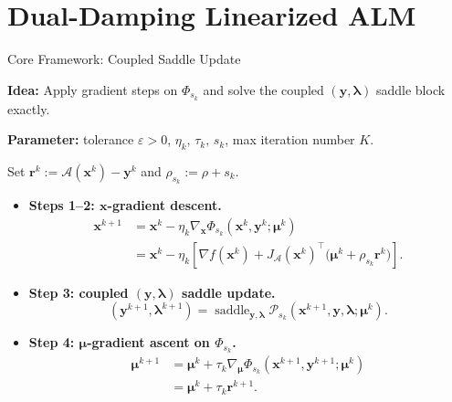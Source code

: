 \documentclass[handout,compress,9pt]{beamer}
\newcommand{\blue}[1]{\textcolor{ddlblue}{#1}}
\newcommand{\bx}{\bm{x}}
\newcommand{\by}{\bm{y}}
\newcommand{\br}{\bm{r}}
\newcommand{\bmu}{\bm{\mu}}
\newcommand{\blmbd}{\bm{\lambda}}
\newcommand{\calA}{\mathcal{A}}
\begin{document}
\section{Dual-Damping Linearized ALM}

\begin{frame}{Core Framework: Coupled Saddle Update}
\vspace{0.1cm}

\noindent\textbf{Idea:} Apply gradient steps on
$\Phi_{s_k}$ and solve the coupled $(\by,\blmbd)$ saddle block exactly.

\noindent\textbf{Parameter:} tolerance $\varepsilon > 0 $, $\eta_k, \, \tau_k, \, s_k$, max iteration number $K$.

Set $\br^k:=\calA(\bx^k)-\by^k$ and $\rho_{s_k}:=\rho+s_k$.

\vspace{0.12cm}
\begin{itemize}
\item[\blue{$\triangleright$}] \textbf{Steps 1--2: $\bx$-gradient descent.}
\begin{equation}\label{eq:slide-exact-multiplier-x}
\begin{aligned}
  \bx^{k+1}
  &=\bx^k-\eta_k\nabla_{\bx}
  \Phi_{s_k}(\bx^k,\by^k;\bmu^k)\\
  &=\bx^k-\eta_k\left[
  \nabla f(\bx^k)+J_{\calA}(\bx^k)^\top
  \bigl(\bmu^k+\rho_{s_k}\br^k\bigr)\right].
\end{aligned}
\end{equation}

\vspace{0.1cm}
\item[\blue{$\triangleright$}] \textbf{Step 3: coupled $(\by,\blmbd)$ saddle update.}
\begin{equation}\label{eq:slide-coupled-saddle-update}
  (\by^{k+1},\blmbd^{k+1})
  =
  \operatorname{saddle}_{\by,\blmbd}
  \mathcal P_{s_k}(\bx^{k+1},\by,\blmbd;\bmu^k).
\end{equation}

\vspace{0.1cm}
\item[\blue{$\triangleright$}] \textbf{Step 4: $\bmu$-gradient ascent on $\Phi_{s_k}$.}
\begin{equation}\label{eq:slide-mu-update}
\begin{aligned}
  \bmu^{k+1}
  &=\bmu^k+\tau_k\nabla_{\bmu}
  \Phi_{s_k}(\bx^{k+1},\by^{k+1};\bmu^k)\\
  &=\bmu^k+\tau_k\br^{k+1}.
\end{aligned}
\end{equation}
\end{itemize}
\end{frame}
\end{document}
